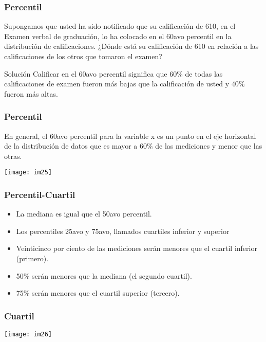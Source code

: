 \documentclass[spanish]{beamer}
\begin{document}
\begin{frame}
\frametitle{Percentil}
Supongamos que usted ha sido notificado que su calificación de 610, en el Examen verbal de graduación, lo ha colocado en el 60avo percentil en la distribución de calificaciones. ¿Dónde está su calificación de 610 en relación a las calificaciones de los otros que tomaron el examen?

\vspace{1em}
Solución Calificar en el 60avo percentil significa que $60\%$ de todas las calificaciones de examen fueron más bajas que la calificación de usted y $40\%$ fueron más altas.

\end{frame}
\begin{frame}
\frametitle{Percentil}
En general, el 60avo percentil para la variable x es un punto en el eje horizontal de la distribución de datos que es mayor a 60\% de las mediciones y menor que las otras.

\begin{center}
\texttt{[image: im25]}
\end{center}

\end{frame}
\begin{frame}
\frametitle{Percentil-Cuartil}

\begin{itemize}
\item La mediana es igual que el 50avo percentil.
\item Los percentiles 25avo y 75avo, llamados cuartiles inferior y superior
\item Veinticinco por ciento de las mediciones serán menores que el cuartil inferior (primero).
\item 50\% serán menores que la mediana (el segundo cuartil).
\item 75\% serán menores que el cuartil superior (tercero).
\end{itemize}

\end{frame}
\begin{frame}
\frametitle{Cuartil}

\begin{center}
\texttt{[image: im26]}
\end{center}

\end{frame}
\end{document}
